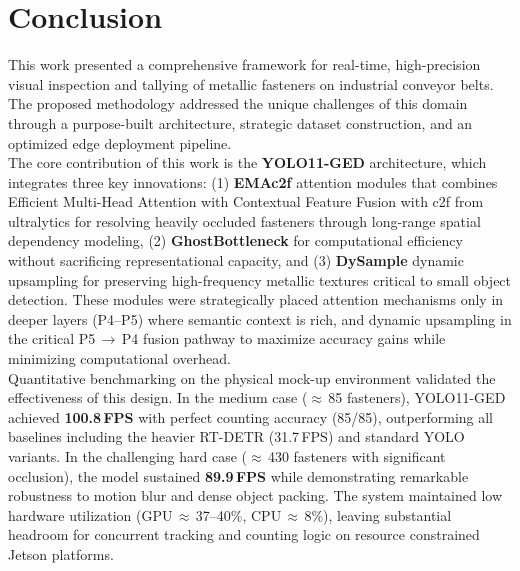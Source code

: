 

\label{chap:conclusion}

\section{Conclusion}

This work presented a comprehensive framework for real-time, high-precision visual inspection and tallying of metallic fasteners on industrial conveyor belts. The proposed methodology addressed the unique challenges of this domain through a purpose-built architecture, strategic dataset construction, and an optimized edge deployment pipeline.\\

The core contribution of this work is the \textbf{YOLO11-GED} architecture, which integrates three key innovations: (1) \textbf{EMAc2f} attention modules that combines \cite{Ouyang_2023} Efficient Multi-Head Attention with Contextual Feature Fusion with c2f from ultralytics for resolving heavily occluded fasteners through long-range spatial dependency modeling, (2) \cite{10537737} \textbf{GhostBottleneck} for computational efficiency without sacrificing representational capacity, and (3) \cite{zhao2025dyglnethybridgloballocalfeature} \textbf{DySample} dynamic upsampling for preserving high-frequency metallic textures critical to small object detection. These modules were strategically placed attention mechanisms only in deeper layers (P4--P5) where semantic context is rich, and dynamic upsampling in the critical P5\,$\rightarrow$\,P4 fusion pathway to maximize accuracy gains while minimizing computational overhead.\\

Quantitative benchmarking on the physical mock-up environment validated the effectiveness of this design. In the medium case ($\approx$\,85 fasteners), YOLO11-GED achieved \textbf{100.8\,FPS} with perfect counting accuracy (85/85), outperforming all baselines including the heavier RT-DETR (31.7\,FPS) and standard YOLO variants. In the challenging hard case ($\approx$\,430 fasteners with significant occlusion), the model sustained \textbf{89.9\,FPS} while demonstrating remarkable robustness to motion blur and dense object packing. The system maintained low hardware utilization (GPU\,$\approx$\,37--40\%, CPU\,$\approx$\,8\%), leaving substantial headroom for concurrent tracking and counting logic on resource constrained Jetson platforms.\\

